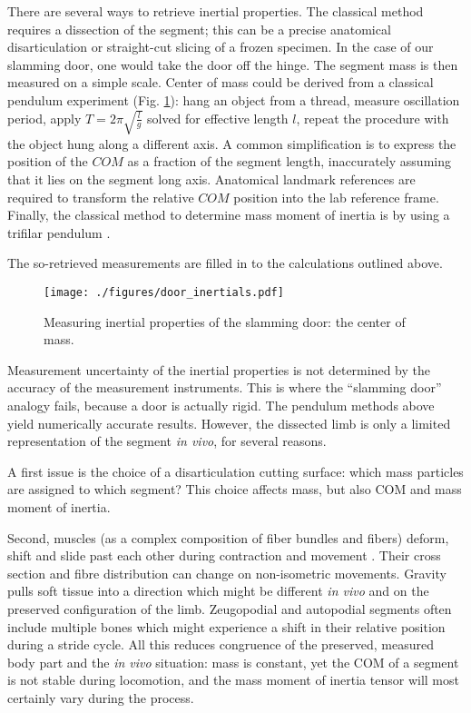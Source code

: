 There are several ways to retrieve inertial properties.
The classical method requires a dissection of the segment; this can be a precise anatomical disarticulation or straight-cut slicing of a frozen specimen.
In the case of our slamming door, one would take the door off the hinge.
The segment mass is then measured on a simple scale.
Center of mass could be derived from a classical pendulum experiment (Fig. \ref{fig:door_inertials}): hang an object from a thread, measure oscillation period, apply \(T=2\pi\sqrt{\frac{l}{g}}\) solved for effective length \(l\), repeat the procedure with the object hung along a different axis.
A common simplification is to express the position of the \(COM\) as a fraction of the segment length, inaccurately assuming that it lies on the segment long axis.
Anatomical landmark references are required to transform the relative \(COM\) position into the lab reference frame.
Finally, the classical method to determine mass moment of inertia is by using a trifilar pendulum \citep{Schedlinski2001,Korr1962}.

The so-retrieved measurements are filled in to the calculations outlined above.


\begin{figure}[htbp]
\centering
\texttt{[image: ./figures/door\_inertials.pdf]}
\caption{\label{fig:door_inertials}Measuring inertial properties of the slamming door: the center of mass.}
\end{figure}


Measurement uncertainty of the inertial properties is not determined by the accuracy of the measurement instruments.
This is where the ``slamming door'' analogy fails, because a door is actually rigid.
The pendulum methods above yield numerically accurate results.
However, the dissected limb is only a limited representation of the segment \emph{in vivo}, for several reasons.

A first issue is the choice of a disarticulation cutting surface: which mass particles are assigned to which segment?
This choice affects mass, but also COM and mass moment of inertia.

Second, muscles (as a complex composition of fiber bundles and fibers) deform, shift and slide past each other during contraction and movement \citep{Bol2013}.
Their cross section and fibre distribution can change on non-isometric movements.
Gravity pulls soft tissue into a direction which might be different \emph{in vivo} and on the preserved configuration of the limb.
Zeugopodial and autopodial segments often include multiple bones which might experience a shift in their relative position during a stride cycle.
All this reduces congruence of the preserved, measured body part and the \emph{in vivo} situation: mass is constant, yet the COM of a segment is not stable during locomotion, and the mass moment of inertia tensor will most certainly vary during the process.

